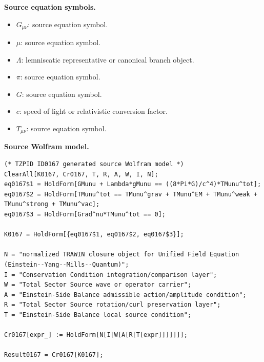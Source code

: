 \begin{minipage}[t]{0.49\linewidth}
\begingroup
\small
\raggedright
\textbf{Source equation symbols.}\par
\begin{itemize}[leftmargin=1.35em,itemsep=1pt,topsep=1pt,parsep=0pt]
    \item $G_{\mu\nu}$: source equation symbol.
    \item $\mu$: source equation symbol.
    \item $\Lambda$: lemniscatic representative or canonical branch object.
    \item $\pi$: source equation symbol.
    \item $G$: source equation symbol.
    \item $c$: speed of light or relativistic conversion factor.
    \item $T_{\mu\nu}$: source equation symbol.
\end{itemize}
\endgroup
\end{minipage}\hfill
\begin{minipage}[t]{0.47\linewidth}
\begingroup
\scriptsize
\raggedright
\textbf{Source Wolfram model.}\par
\begin{Verbatim}[fontsize=\tiny,breaklines=true,breakanywhere=true]
(* TZPID ID0167 generated source Wolfram model *)
ClearAll[K0167, Cr0167, T, R, A, W, I, N];
eq0167$1 = HoldForm[GMunu + Lambda*gMunu == ((8*Pi*G)/c^4)*TMunu^tot];
eq0167$2 = HoldForm[TMunu^tot == TMunu^grav + TMunu^EM + TMunu^weak + TMunu^strong + TMunu^vac];
eq0167$3 = HoldForm[Grad^nu*TMunu^tot == 0];

K0167 = HoldForm[{eq0167$1, eq0167$2, eq0167$3}];

N = "normalized TRAWIN closure object for Unified Field Equation (Einstein--Yang--Mills--Quantum)";
I = "Conservation Condition integration/comparison layer";
W = "Total Sector Source wave or operator carrier";
A = "Einstein-Side Balance admissible action/amplitude condition";
R = "Total Sector Source rotation/curl preservation layer";
T = "Einstein-Side Balance local source condition";

Cr0167[expr_] := HoldForm[N[I[W[A[R[T[expr]]]]]]];

Result0167 = Cr0167[K0167];
\end{Verbatim}
\endgroup
\end{minipage}

